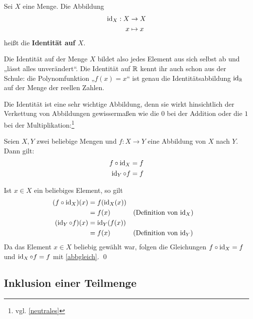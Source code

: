 \begin{de}[Identitätsabbildung]
	Sei $X$ eine Menge. Die Abbildung
	\begin{align*}
		\operatorname{id}_X: X &\to X \\
		x &\mapsto x
	\end{align*}
	heißt die \textbf{Identität auf $X$}.
\end{de}

\begin{bem}
Die Identität auf der Menge $X$ bildet also jedes Element aus sich selbst ab und „lässt alles unverändert“. Die Identität auf ${\mathbb R}$ kennt ihr auch schon aus der Schule: die Polynomfunktion „$f(x)=x$“ ist genau die Identitätsabbildung $\operatorname{id}_{{\mathbb R}}$ auf der Menge der reellen Zahlen.
\end{bem}



Die Identität ist eine sehr wichtige Abbildung, denn sie wirkt hinsichtlich der Verkettung von Abbildungen gewissermaßen wie die $0$ bei der Addition oder die $1$ bei der Multiplikation:\footnote{vgl. \cref{neutrales}}
\begin{sat} \label{idneutral}
    Seien $X,Y$ zwei beliebige Mengen und $f:X\to Y$ eine Abbildung von $X$ nach $Y$. Dann gilt:
    \begin{align*}
     f\circ \operatorname{id}_X & = f \\
     \operatorname{id}_Y \circ f & = f
    \end{align*}
\end{sat}
\begin{bew}
	Ist $x \in X$ ein beliebiges Element, so gilt
    \begin{align*}
(f\circ \operatorname{id}_X)(x) & = f(\operatorname{id}_X(x)) \\
    & =f(x) && (\text{Definition von $\operatorname{id}_X$}) \\
(\operatorname{id}_Y \circ f)(x) & =\operatorname{id}_Y(f(x)) \\
& = f(x)&& (\text{Definition von $\operatorname{id}_Y$})
\end{align*}
Da das Element $x\in X$ beliebig gewählt war, folgen die Gleichungen $f\circ \operatorname{id}_X=f$ und $\operatorname{id}_X\circ f=f$ mit \cref{abbgleich}. \qed
\end{bew}




\subsection{Inklusion einer Teilmenge}

